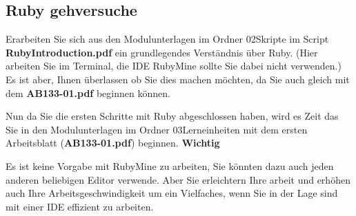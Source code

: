 \subsection{Ruby gehversuche}\label{subsec:rubygehversuche}
\begin{frame}[fragile]
    Erarbeiten Sie sich aus den Modulunterlagen im Ordner 02\textunderscore Skripte im Script \textbf{RubyIntroduction.pdf} ein grundlegendes Verständnis
    über Ruby. (Hier arbeiten Sie im Terminal, die IDE RubyMine sollte Sie dabei nicht verwenden.)
    Es ist aber, Ihnen überlassen ob Sie dies machen möchten, da Sie auch gleich mit dem \textbf{AB133-01.pdf} beginnen können.
\end{frame}

\begin{frame}[fragile]
    Nun da Sie die ersten Schritte mit Ruby abgeschlossen haben, wird es Zeit das Sie in den Modulunterlagen im Ordner
    03\textunderscore Lerneinheiten mit dem ersten Arbeitsblatt (\textbf{AB133-01.pdf}) beginnen.
    \textbf{Wichtig}
    \vSpaceStyle{0.1em}

    Es ist keine Vorgabe mit RubyMine zu arbeiten, Sie könnten dazu auch jeden anderen beliebigen Editor verwende.
    Aber Sie erleichtern Ihre arbeit und erhöhen auch Ihre Arbeitsgeschwindigkeit um ein Vielfaches, wenn Sie in der Lage
    sind mit einer IDE effizient zu arbeiten.
\end{frame}